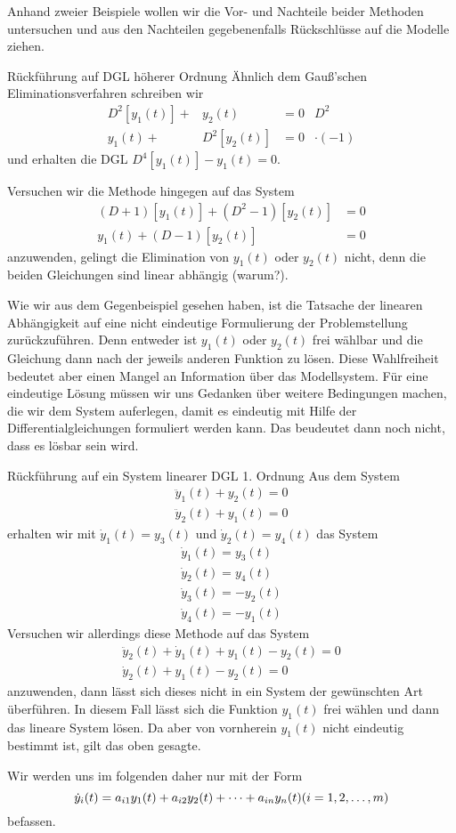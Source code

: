 Anhand zweier Beispiele wollen wir die Vor- und Nachteile beider Methoden
untersuchen und aus den Nachteilen gegebenenfalls Rückschlüsse auf die Modelle
ziehen.
\begin{example}{Rückführung auf DGL höherer Ordnung}
  Ähnlich dem Gauß'schen Eliminationsverfahren schreiben wir
  \begin{equation*}
    \begin{array}{rrl|l}
      D^2[y_1(t)]+&y_2(t)&=0&D^2\\
      y_1(t)+&D^2[y_2(t)]&=0&\cdot(-1)
    \end{array}
  \end{equation*}
  und erhalten die DGL $D^4[y_1(t)]-y_1(t)=0$.

Versuchen wir die Methode hingegen auf das System
\begin{align*}
  (D+1)[y_1(t)]+(D^2-1)[y_2(t)]&=0\\
  y_1(t)+(D-1)[y_2(t)]&=0
\end{align*}
anzuwenden, gelingt die Elimination von $y_1(t)$ oder $y_2(t)$ nicht, denn die
beiden Gleichungen sind linear abhängig (warum?).
\end{example}
Wie wir aus dem Gegenbeispiel gesehen haben, ist die Tatsache der linearen
Abhängigkeit auf eine nicht eindeutige Formulierung der Problemstellung
zurückzuführen. Denn entweder ist $y_1(t)$ oder $y_2(t)$ frei wählbar und die
Gleichung dann nach der jeweils anderen Funktion zu lösen. Diese Wahlfreiheit
bedeutet aber einen Mangel an Information über das Modellsystem. Für eine
eindeutige Lösung müssen wir uns Gedanken über weitere Bedingungen machen, die
wir dem System auferlegen, damit es eindeutig mit Hilfe der
Differentialgleichungen formuliert werden kann. Das beudeutet dann noch nicht,
dass es lösbar sein wird.
\begin{example}{Rückführung auf ein System linearer DGL 1. Ordnung}
  Aus dem System
  \begin{align*}
    \ddot{y}_1(t)+y_2(t)=0\\
    \ddot{y}_2(t)+y_1(t)=0
  \end{align*}
  erhalten wir mit $\dot{y}_1(t)=y_3(t)$ und $\dot{y}_2(t)=y_4(t)$ das System
  \begin{align*}
    \dot{y}_1(t)=y_3(t)\\
    \dot{y}_2(t)=y_4(t)\\
    \dot{y}_3(t)=-y_2(t)\\
    \dot{y}_4(t)=-y_1(t)
  \end{align*}
  Versuchen wir allerdings diese Methode auf das System
    \begin{align*}
      \ddot{y}_2(t)+\dot{y}_1(t)+y_1(t)-y_2(t)=0\\
      \dot{y}_2(t)+y_1(t)-y_2(t)=0
  \end{align*}
  anzuwenden, dann lässt sich dieses nicht in ein System der gewünschten Art
  überführen. In diesem Fall lässt sich die Funktion $y_1(t)$ frei wählen und
  dann das lineare System lösen. Da aber von vornherein $y_1(t)$ nicht
  eindeutig bestimmt ist, gilt das oben gesagte.
\end{example}
Wir werden uns im folgenden daher nur mit der Form
\[
  \dot{y}_i(t)=a_{i1}y_1(t)+a_{i2}y_2(t)+\dots+a_{in}y_n(t)\hfill (i=1,2,\dots,m)
\]
befassen.
